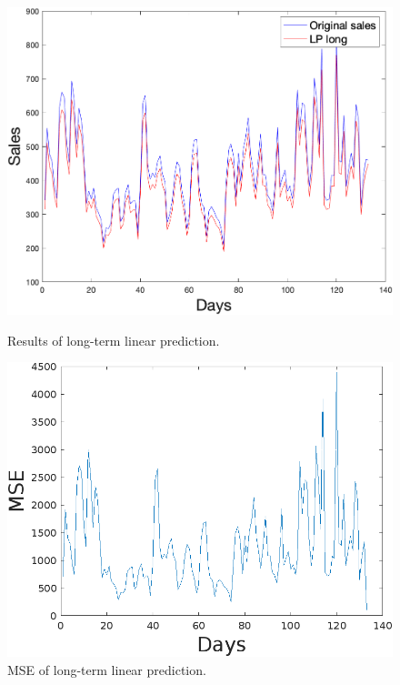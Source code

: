         \begin{figure}[h]
            \centering
            \begin{minipage}{0.45\textwidth}
                \centering
                \includegraphics[width=1\textwidth]{figures/expLTLP.png}
                \caption{Results of long-term linear prediction.}
                \label{fig:ltlp}
            \end{minipage}\hfill
            \begin{minipage}{0.45\textwidth}
                \centering
                \includegraphics[width=1\textwidth]{figures/expMseLTLP.png}
                \caption{MSE of long-term linear prediction.}
                \label{fig:ltlpmse}
            \end{minipage}
        \end{figure}
        
